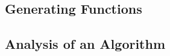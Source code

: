 \tasktodo

\tasktodo

\tasktodo

\subsection{Generating Functions}

\tasktodo

\tasktodo

\tasktodo

\tasktodo

\tasktodo

\tasktodo

\tasktodo

\tasktodo

\tasktodo

\tasktodo

\tasktodo

\tasktodo

\tasktodo

\tasktodo

\tasktodo

\tasktodo

\tasktodo

\tasktodo

\tasktodo

\tasktodo

\tasktodo

\tasktodo

\tasktodo

\tasktodo

\tasktodo

\tasktodo


\subsection{Analysis of an Algorithm}

\tasktodo

\tasktodo

